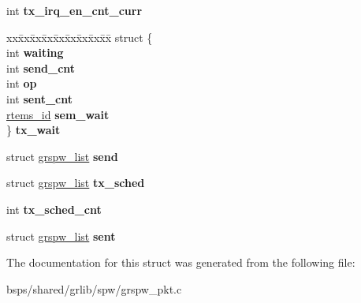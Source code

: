 \begin{DoxyCompactItemize}
\mbox{\label{structgrspw__dma__priv_a2ec0230d51086f0bde29e7f6e65d3409}} 
int {\bfseries tx\+\_\+irq\+\_\+en\+\_\+cnt\+\_\+curr}
\item 
\mbox{\label{structgrspw__dma__priv_a2cb69c62ead532d5fc49c2ba933f95d1}} 
\begin{tabbing}
xx\=xx\=xx\=xx\=xx\=xx\=xx\=xx\=xx\=\kill
struct \{\\
\>int {\bfseries waiting}\\
\>int {\bfseries send\_cnt}\\
\>int {\bfseries op}\\
\>int {\bfseries sent\_cnt}\\
\>\mbox{\hyperlink{group__ClassicTasks_gab20892b814dced7dd4e5b9bf42becd57}{rtems\_id}} {\bfseries sem\_wait}\\
\} {\bfseries tx\_wait}\\

\end{tabbing}\item 
\mbox{\label{structgrspw__dma__priv_a76b84c9433d21d0b32c90867cd74a07e}} 
struct \mbox{\hyperlink{structgrspw__list}{grspw\+\_\+list}} {\bfseries send}
\item 
\mbox{\label{structgrspw__dma__priv_afedc4b274a15b36245e065c93a44daf9}} 
struct \mbox{\hyperlink{structgrspw__list}{grspw\+\_\+list}} {\bfseries tx\+\_\+sched}
\item 
\mbox{\label{structgrspw__dma__priv_a6eb5d689e843cf003a7dfe79ac154609}} 
int {\bfseries tx\+\_\+sched\+\_\+cnt}
\item 
\mbox{\label{structgrspw__dma__priv_a5db8ac5bc2919a23c8c480a5565091e3}} 
struct \mbox{\hyperlink{structgrspw__list}{grspw\+\_\+list}} {\bfseries sent}
\end{DoxyCompactItemize}


The documentation for this struct was generated from the following file\+:\begin{DoxyCompactItemize}
\item 
bsps/shared/grlib/spw/grspw\+\_\+pkt.\+c\end{DoxyCompactItemize}
